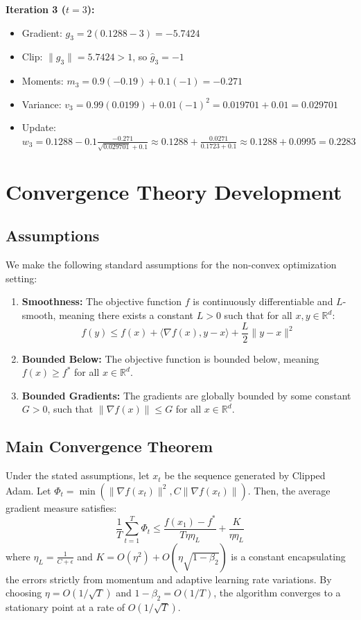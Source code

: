 \documentclass{article}
\begin{document}
\textbf{Iteration 3 ($t=3$):}
\begin{itemize}
    \item Gradient: $g_3 = 2(0.1288 - 3) = -5.7424$
    \item Clip: $\|g_3\| = 5.7424 > 1$, so $\hat{g}_3 = -1$
    \item Moments: $m_3 = 0.9(-0.19) + 0.1(-1) = -0.271$
    \item Variance: $v_3 = 0.99(0.0199) + 0.01(-1)^2 = 0.019701 + 0.01 = 0.029701$
    \item Update: $w_3 = 0.1288 - 0.1 \frac{-0.271}{\sqrt{0.029701} + 0.1} \approx 0.1288 + \frac{0.0271}{0.1723 + 0.1} \approx 0.1288 + 0.0995 = 0.2283$
\end{itemize}

\section*{Convergence Theory Development}

\subsection*{Assumptions}
We make the following standard assumptions for the non-convex optimization setting:
\begin{enumerate}
    \item \textbf{Smoothness:} The objective function $f$ is continuously differentiable and $L$-smooth, meaning there exists a constant $L > 0$ such that for all $x, y \in \mathbb{R}^d$:
    \begin{equation}
        f(y) \leq f(x) + \langle \nabla f(x), y - x \rangle + \frac{L}{2} \|y - x\|^2
    \end{equation}
    \item \textbf{Bounded Below:} The objective function is bounded below, meaning $f(x) \geq f^*$ for all $x \in \mathbb{R}^d$.
    \item \textbf{Bounded Gradients:} The gradients are globally bounded by some constant $G > 0$, such that $\|\nabla f(x)\| \leq G$ for all $x \in \mathbb{R}^d$.
\end{enumerate}

\subsection*{Main Convergence Theorem}
Under the stated assumptions, let $x_t$ be the sequence generated by Clipped Adam. Let $\Phi_t = \min(\|\nabla f(x_t)\|^2, C \|\nabla f(x_t)\|)$. Then, the average gradient measure satisfies:
\begin{equation}
    \frac{1}{T} \sum_{t=1}^T \Phi_t \leq \frac{f(x_1) - f^*}{T \eta \eta_L} + \frac{K}{\eta \eta_L}
\end{equation}
where $\eta_L = \frac{1}{C + \epsilon}$ and $K = O(\eta^2) + O(\eta \sqrt{1-\beta_2})$ is a constant encapsulating the errors strictly from momentum and adaptive learning rate variations. By choosing $\eta = O(1/\sqrt{T})$ and $1-\beta_2 = O(1/T)$, the algorithm converges to a stationary point at a rate of $O(1/\sqrt{T})$.
\end{document}

